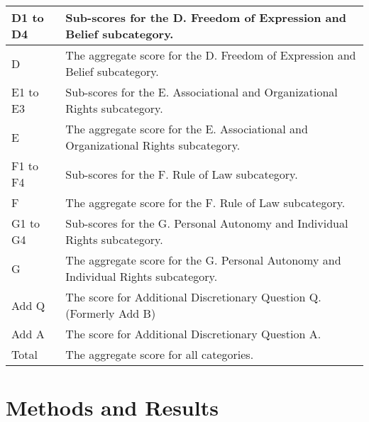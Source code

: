 \documentclass{article}
\theoremstyle{plain}
\theoremstyle{definition}
\theoremstyle{remark}
\begin{document}
\begin{table}[H]
\begin{center}
\begin{small}
\begin{tabular}{|p{}|p{}|}
D1 to D4 & Sub-scores for the D. Freedom of Expression and Belief subcategory. \\
\hline

D & The aggregate score for the D. Freedom of Expression and Belief subcategory. \\
\hline

E1 to E3 & Sub-scores for the E. Associational and Organizational Rights subcategory. \\
\hline

E & The aggregate score for the E. Associational and Organizational Rights subcategory. \\
\hline

F1 to F4 & Sub-scores for the F. Rule of Law subcategory. \\
\hline

F & The aggregate score for the F. Rule of Law subcategory. \\
\hline

G1 to G4 & Sub-scores for the G. Personal Autonomy and Individual Rights subcategory. \\
\hline

G & The aggregate score for the G. Personal Autonomy and Individual Rights subcategory. \\
\hline

Add Q & The score for Additional Discretionary Question Q. (Formerly Add B) \\
\hline

Add A & The score for Additional Discretionary Question A. \\
\hline

Total & The aggregate score for all categories. \\
\hline

\end{tabular}

\end{small}

\end{center}

\vskip -0.1in

\end{table}











\section{Methods and Results}
\label{methods}
\end{document}
